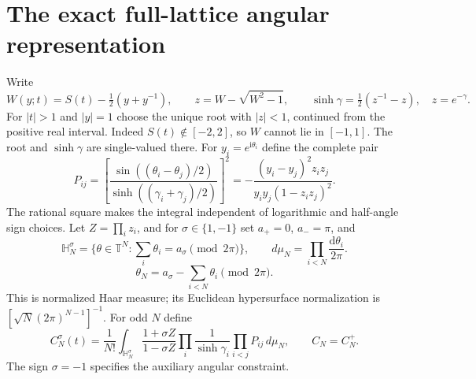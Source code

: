 \documentclass[11pt]{article}
\numberwithin{equation}{section}
\theoremstyle{remark}\newtheorem{remark}[theorem]{Remark}
\newcommand{\ii}{\mathrm i}
\newcommand{\dd}{\mathrm d}
\newcommand{\T}{\mathbb T}
\begin{document}
\section{The exact full-lattice angular representation}
\label{sec:representation}\label{sec:angular-bulk}
Write
\[
 W(y;t)=S(t)-\tfrac12(y+y^{-1}),\qquad
 z=W-\sqrt{W^2-1},\qquad
 \sinh\gamma=\tfrac12(z^{-1}-z),\quad z=e^{-\gamma}.
\]
For $|t|>1$ and $|y|=1$ choose the unique root with $|z|<1$,
continued from the positive real interval. Indeed $S(t)\notin[-2,2]$,
so $W$ cannot lie in $[-1,1]$. The root and $\sinh\gamma$ are
single-valued there.
For $y_i=e^{\ii\theta_i}$ define the complete pair
\begin{equation}\label{eq:kernel-square}
 P_{ij}=
 \left[\frac{\sin((\theta_i-\theta_j)/2)}
 {\sinh((\gamma_i+\gamma_j)/2)}\right]^2
 =-\frac{(y_i-y_j)^2z_i z_j}{y_i y_j(1-z_i z_j)^2}.
\end{equation}
The rational square makes the integral independent of logarithmic and
half-angle sign choices.
Let $Z=\prod_i z_i$, and for $\sigma\in\{1,-1\}$ set
$a_+=0$, $a_-=\pi$, and
\[
 \mathbb H_N^\sigma=\{\theta\in\T^N:\textstyle\sum_i\theta_i
                       =a_\sigma\pmod {2\pi}\},\qquad
 d\mu_N=\prod_{i<N}\frac{\dd\theta_i}{2\pi}.
\]
\[
 \theta_N=a_\sigma-\sum_{i<N}\theta_i\pmod {2\pi}.
\]
This is normalized Haar measure; its Euclidean hypersurface
normalization is $[\sqrt N(2\pi)^{N-1}]^{-1}$.
For odd $N$ define
\begin{equation}\label{eq:angular-bulk}
 C_N^\sigma(t)=\frac1{N!}\int_{\mathbb H_N^\sigma}
    \frac{1+\sigma Z}{1-\sigma Z}
    \prod_i\frac1{\sinh\gamma_i}\prod_{i<j}P_{ij}\,d\mu_N,
 \qquad C_N=C_N^+.
\end{equation}
The sign $\sigma=-1$ specifies the auxiliary angular constraint.
\end{document}
